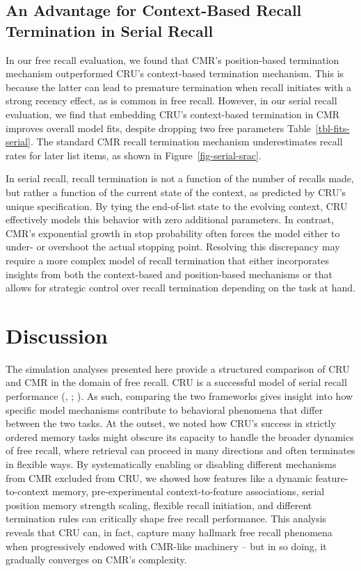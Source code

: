 \documentclass[
  man,
  floatsintext,
  longtable,
  nolmodern,
  notxfonts,
  notimes,
  draftfirst,
  colorlinks=true,linkcolor=blue,citecolor=blue,urlcolor=blue]{apa7}
\begin{document}
\subsection{An Advantage for Context-Based Recall Termination in Serial
Recall}\label{an-advantage-for-context-based-recall-termination-in-serial-recall}

In our free recall evaluation, we found that CMR's position-based
termination mechanism outperformed CRU's context-based termination
mechanism. This is because the latter can lead to premature termination
when recall initiates with a strong recency effect, as is common in free
recall. However, in our serial recall evaluation, we find that embedding
CRU's context-based termination in CMR improves overall model fits,
despite dropping two free parameters Table~\ref{tbl-fits-serial}. The
standard CMR recall termination mechanism underestimates recall rates
for later list items, as shown in Figure~\ref{fig-serial-srac}.

In serial recall, recall termination is not a function of the number of
recalls made, but rather a function of the current state of the context,
as predicted by CRU's unique specification. By tying the end-of-list
state to the evolving context, CRU effectively models this behavior with
zero additional parameters. In contrast, CMR's exponential growth in
stop probability often forces the model either to under- or overshoot
the actual stopping point. Resolving this discrepancy may require a more
complex model of recall termination that either incorporates insights
from both the context-based and position-based mechanisms or that allows
for strategic control over recall termination depending on the task at
hand.

\section{Discussion}\label{discussion}

The simulation analyses presented here provide a structured comparison
of CRU and CMR in the domain of free recall. CRU is a successful model
of serial recall performance (, ;
). As such, comparing
the two frameworks gives insight into how specific model mechanisms
contribute to behavioral phenomena that differ between the two tasks. At
the outset, we noted how CRU's success in strictly ordered memory tasks
might obscure its capacity to handle the broader dynamics of free
recall, where retrieval can proceed in many directions and often
terminates in flexible ways. By systematically enabling or disabling
different mechanisms from CMR excluded from CRU, we showed how features
like a dynamic feature-to-context memory, pre-experimental
context-to-feature associations, serial position memory strength
scaling, flexible recall initiation, and different termination rules can
critically shape free recall performance. This analysis reveals that CRU
can, in fact, capture many hallmark free recall phenomena when
progressively endowed with CMR-like machinery -- but in so doing, it
gradually converges on CMR's complexity.
\end{document}
